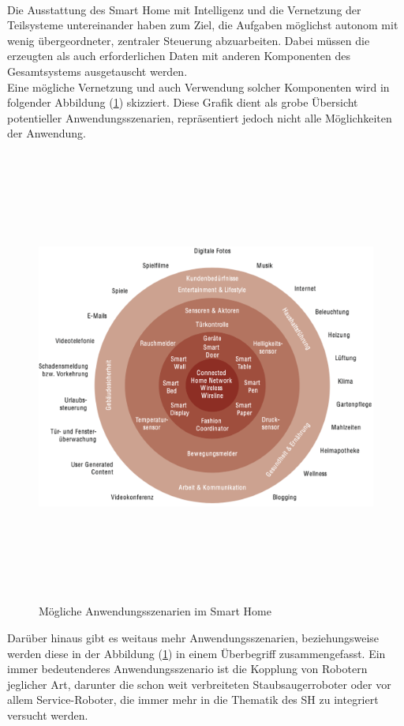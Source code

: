         \\
        \linebreak
        Die Ausstattung des Smart Home mit Intelligenz und die Vernetzung der Teilsysteme untereinander haben zum Ziel, die Aufgaben möglichst 
        autonom mit wenig übergeordneter, zentraler Steuerung abzuarbeiten. 
        Dabei müssen die erzeugten als auch erforderlichen Daten mit anderen 
        Komponenten des Gesamtsystems ausgetauscht werden. 
        \\
        Eine mögliche Vernetzung und auch Verwendung solcher Komponenten wird in folgender Abbildung (\ref{pic:szenarien-smarhome}) 
        skizziert. Diese Grafik dient als grobe Übersicht potentieller Anwendungsszenarien, repräsentiert jedoch nicht alle Möglichkeiten der Anwendung. %
        \begin{figure}[hbt!]
            \centering
            \includegraphics[width=15cm,height=15cm,keepaspectratio]{images/Anwendungsszenarien_SH.png}
            \caption{Mögliche Anwendungsszenarien im Smart Home \cite{strese.2010m}}
            \label{pic:szenarien-smarhome}
        \end{figure}
        Darüber hinaus gibt es weitaus mehr Anwendungsszenarien, beziehungsweise werden diese in der Abbildung 
        (\ref{pic:szenarien-smarhome}) in einem Überbegriff zusammengefasst.
        Ein immer bedeutenderes Anwendungsszenario ist die Kopplung 
        von Robotern jeglicher Art, darunter die schon weit verbreiteten Staubsaugerroboter oder 
        vor allem Service-Roboter, die immer mehr in die Thematik des \acl{SH}  zu integriert versucht werden. 
        
